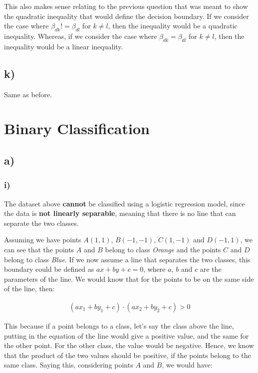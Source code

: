 \documentclass[12pt,a4paper,oneside]{paper}
\begin{document}
This also makes sense relating to the previous question that was meant to show the quadratic inequality that would define the decision boundary.
If we consider the case where $\beta_{dk} != \beta_{dl}$ for $k \neq l$, then the inequality would be a quadratic inequality. 
Whereas, if we consider the case where $\beta_{dk} = \beta_{dl}$ for $k \neq l$, then the inequality would be a linear inequality.

\subsection*{k)}
Same as before. 

\section{Binary Classification}

\subsection*{a)}

\subsubsection*{i)}

The dataset above \textbf{cannot} be classified using a logistic regression model, since the data is \textbf{not linearly separable}, 
meaning that there is no line that can separate the two classes.

Assuming we have points $A (1, 1)$, $B (-1, -1)$, $C (1, -1)$ and $D (-1, 1)$, we can see that the points $A$ and $B$ belong to class \textit{Orange} and the points $C$ and $D$ belong to class \textit{Blue}.
If we now assume a line that separates the two classes, this boundary could be defined as $ax + by + c = 0$, where $a$, $b$ and $c$ are the parameters of the line.
We would know that for the points to be on the same side of the line, then: 

\begin{align*}
    (ax_1 + by_1 + c) \cdot (ax_2 + by_2 + c) > 0
\end{align*}

This because if a point belongs to a class, let's say the class above the line, putting in the equation of the line would give a positive value, and the same for the other point.
For the other class, the value would be negative. Hence, we know that the product of the two values should be positive, if the points belong to the same class.
Saying this, considering points $A$ and $B$, we would have:
\end{document}
